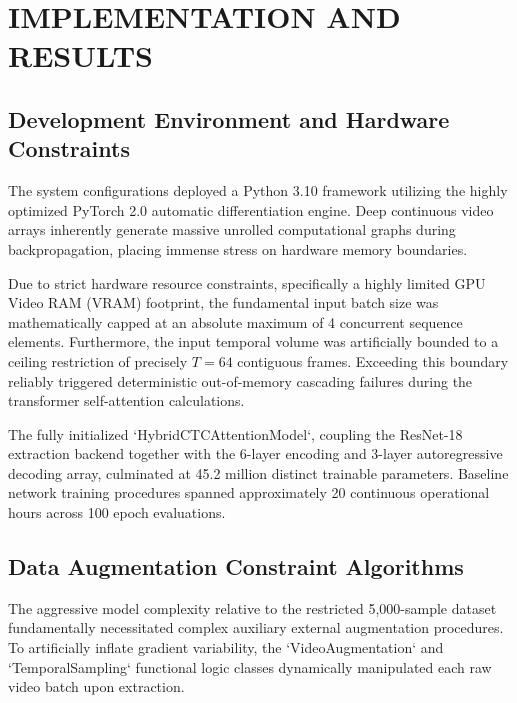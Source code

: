 \chapter{IMPLEMENTATION AND RESULTS}

\section{Development Environment and Hardware Constraints}

The system configurations deployed a Python 3.10 framework utilizing the highly optimized PyTorch 2.0 automatic differentiation engine. Deep continuous video arrays inherently generate massive unrolled computational graphs during backpropagation, placing immense stress on hardware memory boundaries. 

Due to strict hardware resource constraints, specifically a highly limited GPU Video RAM (VRAM) footprint, the fundamental input batch size was mathematically capped at an absolute maximum of 4 concurrent sequence elements. Furthermore, the input temporal volume was artificially bounded to a ceiling restriction of precisely $T=64$ contiguous frames. Exceeding this boundary reliably triggered deterministic out-of-memory cascading failures during the transformer self-attention calculations. 

The fully initialized `HybridCTCAttentionModel`, coupling the ResNet-18 extraction backend together with the 6-layer encoding and 3-layer autoregressive decoding array, culminated at 45.2 million distinct trainable parameters. Baseline network training procedures spanned approximately 20 continuous operational hours across 100 epoch evaluations.

\section{Data Augmentation Constraint Algorithms}

The aggressive model complexity relative to the restricted 5,000-sample dataset fundamentally necessitated complex auxiliary external augmentation procedures. To artificially inflate gradient variability, the `VideoAugmentation` and `TemporalSampling` functional logic classes dynamically manipulated each raw video batch upon extraction.

